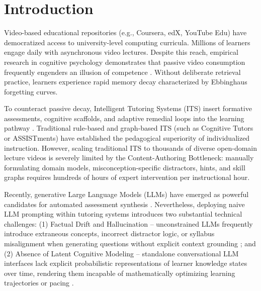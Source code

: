 \documentclass[notitlepage,12pt]{jedm}
\begin{document}
\begin{abstract}
{\parindent0pt
\textbf{Keywords:} adaptive learning, Bayesian knowledge tracing, contextual bandits, Thompson sampling, retrieval-augmented generation, reproducibility
}
\end{abstract}

\section{Introduction}
Video-based educational repositories (e.g., Coursera, edX, YouTube Edu) have democratized access to university-level computing curricula. Millions of learners engage daily with asynchronous video lectures. Despite this reach, empirical research in cognitive psychology demonstrates that passive video consumption frequently engenders an illusion of competence \cite{dunlosky2013improving,karpicke2008critical}. Without deliberate retrieval practice, learners experience rapid memory decay characterized by Ebbinghaus forgetting curves.

To counteract passive decay, Intelligent Tutoring Systems (ITS) insert formative assessments, cognitive scaffolds, and adaptive remedial loops into the learning pathway \cite{koedinger1997intelligent,bloom19842,vanlehn2006behavior}. Traditional rule-based and graph-based ITS (such as Cognitive Tutors or ASSISTments) have established the pedagogical superiority of individualized instruction. However, scaling traditional ITS to thousands of diverse open-domain lecture videos is severely limited by the Content-Authoring Bottleneck: manually formulating domain models, misconception-specific distractors, hints, and skill graphs requires hundreds of hours of expert intervention per instructional hour.

Recently, generative Large Language Models (LLMs) have emerged as powerful candidates for automated assessment synthesis \cite{scarlatos2024distractor,dan2023educhat,pardos2023chatgpt}. Nevertheless, deploying naive LLM prompting within tutoring systems introduces two substantial technical challenges: (1) Factual Drift and Hallucination -- unconstrained LLMs frequently introduce extraneous concepts, incorrect distractor logic, or syllabus misalignment when generating questions without explicit context grounding \cite{gao2023retrieval,niu2024reducing}; and (2) Absence of Latent Cognitive Modeling -- standalone conversational LLM interfaces lack explicit probabilistic representations of learner knowledge states over time, rendering them incapable of mathematically optimizing learning trajectories or pacing \cite{piech2015deep,pelanek2017bayesian,doroudi2019where}.
\end{document}
